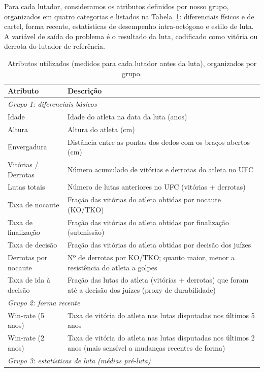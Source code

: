 \documentclass[10pt]{article}
\begin{document}
Para cada lutador, consideramos os atributos definidos por nosso grupo,
organizados em quatro categorias e listados na Tabela~\ref{tab:atributos}:
diferenciais físicos e de cartel, forma recente, estatísticas de desempenho
intra-octógono e estilo de luta. A variável de saída do problema é o
resultado da luta, codificado como vitória ou derrota do lutador de
referência.

\begin{table}[t]
\centering
\caption{Atributos utilizados (medidos para cada lutador antes da luta),
organizados por grupo.}
\label{tab:atributos}
\begin{tabularx}{\textwidth}{l X}
\toprule
Atributo & Descrição \\
\midrule
\multicolumn{2}{l}{\emph{Grupo 1: diferenciais básicos}} \\
\midrule
Idade & Idade do atleta na data da luta (anos) \\
Altura & Altura do atleta (cm) \\
Envergadura & Distância entre as pontas dos dedos com os braços abertos (cm) \\
Vitórias / Derrotas & Número acumulado de vitórias e derrotas do atleta no UFC \\
Lutas totais & Número de lutas anteriores no UFC (vitórias + derrotas) \\
Taxa de nocaute & Fração das vitórias do atleta obtidas por nocaute (KO/TKO) \\
Taxa de finalização & Fração das vitórias do atleta obtidas por finalização (submissão) \\
Taxa de decisão & Fração das vitórias do atleta obtidas por decisão dos juízes \\
Derrotas por nocaute & Nº de derrotas por KO/TKO; quanto maior, menor a resistência do atleta a golpes \\
Taxa de ida à decisão & Fração das lutas do atleta (vitórias + derrotas) que foram até a decisão dos juízes (proxy de durabilidade) \\
\midrule
\multicolumn{2}{l}{\emph{Grupo 2: forma recente}} \\
\midrule
Win-rate (5 anos) & Taxa de vitória do atleta nas lutas disputadas nos últimos 5 anos \\
Win-rate (2 anos) & Taxa de vitória do atleta nas lutas disputadas nos últimos 2 anos (mais sensível a mudanças recentes de forma) \\
\midrule
\multicolumn{2}{l}{\emph{Grupo 3: estatísticas de luta (médias pré-luta)}} \\

\end{tabularx}
\end{table}
\end{document}
